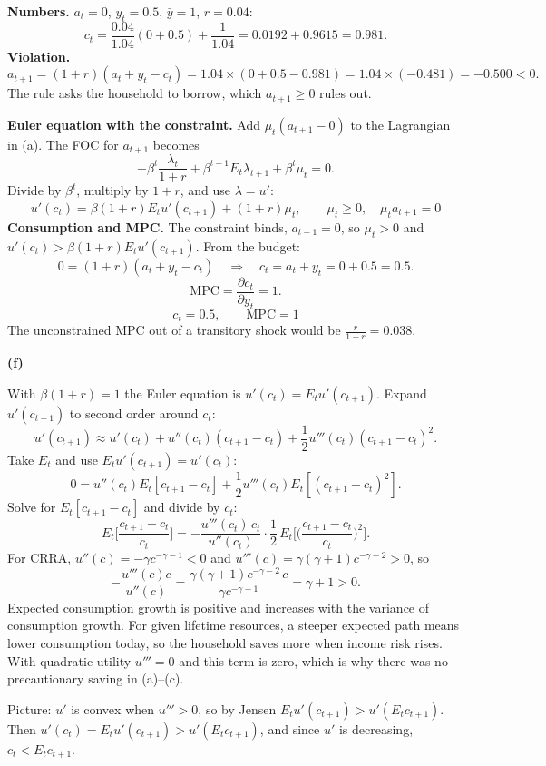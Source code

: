 \documentclass[12pt]{article}
\newcommand{\E}{E}
\newcommand{\pt}[1]{\par\bigskip\textbf{(#1)}\par}
\newcommand{\ans}[1]{\[\boxed{\ #1\ }\]}
\begin{document}
\textbf{Numbers.} $a_t=0$, $y_t=0.5$, $\bar y=1$, $r=0.04$:
\[
c_t=\frac{0.04}{1.04}(0+0.5)+\frac{1}{1.04}=0.0192+0.9615=0.981 .
\]
\textbf{Violation.}
\[
a_{t+1}=(1+r)(a_t+y_t-c_t)=1.04\times(0+0.5-0.981)=1.04\times(-0.481)=-0.500<0 .
\]
The rule asks the household to borrow, which $a_{t+1}\ge0$ rules out.

\textbf{Euler equation with the constraint.} Add $\mu_t(a_{t+1}-0)$ to the
Lagrangian in (a). The FOC for $a_{t+1}$ becomes
\[
-\beta^t\frac{\lambda_t}{1+r}+\beta^{t+1}\E_t\lambda_{t+1}+\beta^t\mu_t=0 .
\]
Divide by $\beta^t$, multiply by $1+r$, and use $\lambda=u'$:
\ans{u'(c_t)=\beta(1+r)\E_tu'(c_{t+1})+(1+r)\mu_t,\qquad\mu_t\ge0,\quad\mu_ta_{t+1}=0}
\textbf{Consumption and MPC.} The constraint binds, $a_{t+1}=0$, so
$\mu_t>0$ and $u'(c_t)>\beta(1+r)\E_tu'(c_{t+1})$. From the budget:
\[
0=(1+r)(a_t+y_t-c_t)\quad\Longrightarrow\quad c_t=a_t+y_t=0+0.5=0.5 .
\]
\[
\text{MPC}=\frac{\partial c_t}{\partial y_t}=1 .
\]
\ans{c_t=0.5,\qquad\text{MPC}=1}
The unconstrained MPC out of a transitory shock would be
$\frac{r}{1+r}=0.038$.

\pt{f}
With $\beta(1+r)=1$ the Euler equation is $u'(c_t)=\E_tu'(c_{t+1})$.
Expand $u'(c_{t+1})$ to second order around $c_t$:
\[
u'(c_{t+1})\approx u'(c_t)+u''(c_t)(c_{t+1}-c_t)+\frac12u'''(c_t)(c_{t+1}-c_t)^2 .
\]
Take $\E_t$ and use $\E_tu'(c_{t+1})=u'(c_t)$:
\[
0=u''(c_t)\E_t[c_{t+1}-c_t]+\frac12u'''(c_t)\E_t[(c_{t+1}-c_t)^2].
\]
Solve for $\E_t[c_{t+1}-c_t]$ and divide by $c_t$:
\[
\E_t\Big[\frac{c_{t+1}-c_t}{c_t}\Big]=-\frac{u'''(c_t)\,c_t}{u''(c_t)}\cdot\frac12\,\E_t\Big[\Big(\frac{c_{t+1}-c_t}{c_t}\Big)^2\Big].
\]
For CRRA, $u''(c)=-\gamma c^{-\gamma-1}<0$ and
$u'''(c)=\gamma(\gamma+1)c^{-\gamma-2}>0$, so
\[
-\frac{u'''(c)c}{u''(c)}=\frac{\gamma(\gamma+1)c^{-\gamma-2}\,c}{\gamma c^{-\gamma-1}}=\gamma+1>0 .
\]
Expected consumption growth is positive and increases with the variance of
consumption growth. For given lifetime resources, a steeper expected path
means lower consumption today, so the household saves more when income risk
rises. With quadratic utility $u'''=0$ and this term is zero, which is why
there was no precautionary saving in (a)--(c).

Picture: $u'$ is convex when $u'''>0$, so by Jensen
$\E_tu'(c_{t+1})>u'(\E_tc_{t+1})$. Then
$u'(c_t)=\E_tu'(c_{t+1})>u'(\E_tc_{t+1})$, and since $u'$ is decreasing,
$c_t<\E_tc_{t+1}$.
\end{document}
